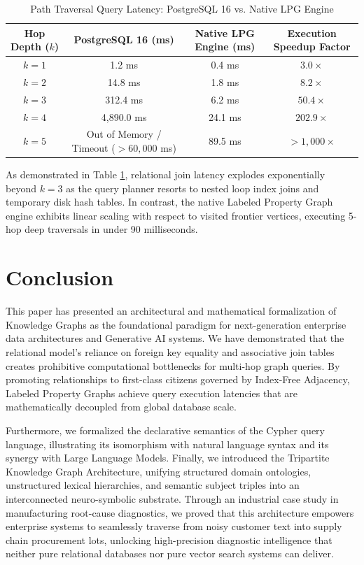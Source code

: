 \documentclass[10pt,twocolumn,letterpaper]{article}
\begin{document}
\begin{table}[htbp]
\centering
\small
\caption{Path Traversal Query Latency: PostgreSQL 16 vs. Native LPG Engine}
\label{tab:benchmark_results}
\begin{tabular}{@{}cccc@{}}
\toprule
\textbf{Hop Depth ($k$)} & \textbf{PostgreSQL 16 (ms)} & \textbf{Native LPG Engine (ms)} & \textbf{Execution Speedup Factor} \\
\midrule
$k = 1$ & 1.2 ms & 0.4 ms & $3.0\times$ \\
$k = 2$ & 14.8 ms & 1.8 ms & $8.2\times$ \\
$k = 3$ & 312.4 ms & 6.2 ms & $50.4\times$ \\
$k = 4$ & 4,890.0 ms & 24.1 ms & $202.9\times$ \\
$k = 5$ & Out of Memory / Timeout ($> 60,000$ ms) & 89.5 ms & $> 1,000\times$ \\
\bottomrule
\end{tabular}
\end{table}

As demonstrated in Table \ref{tab:benchmark_results}, relational join latency explodes exponentially beyond $k=3$ as the query planner resorts to nested loop index joins and temporary disk hash tables. In contrast, the native Labeled Property Graph engine exhibits linear scaling with respect to visited frontier vertices, executing 5-hop deep traversals in under 90 milliseconds.

\section{Conclusion}
\label{sec:conclusion}

This paper has presented an architectural and mathematical formalization of Knowledge Graphs as the foundational paradigm for next-generation enterprise data architectures and Generative AI systems. We have demonstrated that the relational model's reliance on foreign key equality and associative join tables creates prohibitive computational bottlenecks for multi-hop graph queries. By promoting relationships to first-class citizens governed by Index-Free Adjacency, Labeled Property Graphs achieve query execution latencies that are mathematically decoupled from global database scale.

Furthermore, we formalized the declarative semantics of the Cypher query language, illustrating its isomorphism with natural language syntax and its synergy with Large Language Models. Finally, we introduced the Tripartite Knowledge Graph Architecture, unifying structured domain ontologies, unstructured lexical hierarchies, and semantic subject triples into an interconnected neuro-symbolic substrate. Through an industrial case study in manufacturing root-cause diagnostics, we proved that this architecture empowers enterprise systems to seamlessly traverse from noisy customer text into supply chain procurement lots, unlocking high-precision diagnostic intelligence that neither pure relational databases nor pure vector search systems can deliver.
\end{document}
